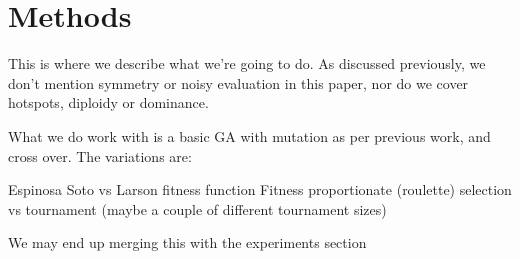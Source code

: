 \section{Methods}
This is where we describe what we're going to do. As discussed previously, 
we don't mention symmetry or noisy evaluation in this paper, nor do we cover 
hotspots, diploidy or dominance.

What we do work with is a basic GA with mutation as per previous work, and cross
over. The variations are:

Espinosa Soto vs Larson fitness function
Fitness proportionate (roulette) selection vs tournament (maybe a couple of different tournament sizes)

We may end up merging this with the experiments section

